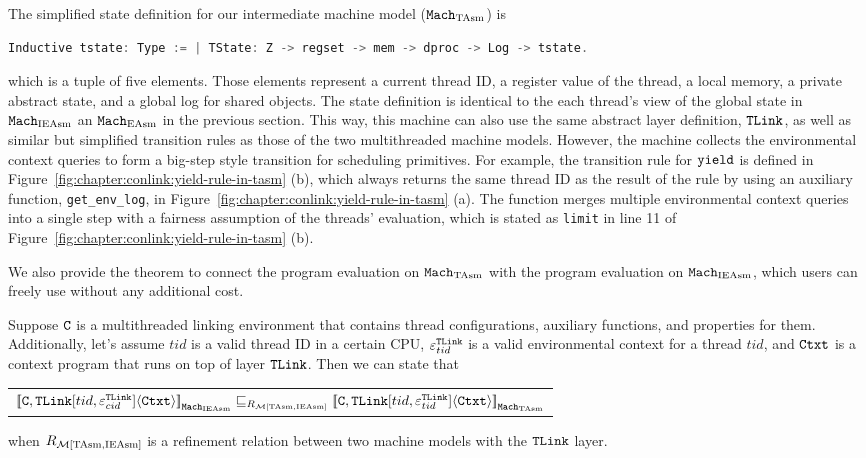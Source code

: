 The simplified state definition for our intermediate machine model (${\mathrm{\texttt{Mach}}}_{\mathrm{TAsm}}$) is
\begin{lstlisting}[language=C]
Inductive tstate: Type := | TState: Z -> regset -> mem -> dproc -> Log -> tstate.
\end{lstlisting}
which is a tuple of five elements. 
Those elements represent a current thread ID, 
a register value of the thread, a local memory, a private abstract state, and a global log for shared objects. 
The state definition is identical to the each thread's view of the global state in ${\mathrm{\texttt{Mach}}}_{\mathrm{IEAsm}}$ an ${\mathrm{\texttt{Mach}}}_{\mathrm{EAsm}}$ in the previous section. 
This way,
this machine can also use the same abstract layer definition, ${{\mathrm{\texttt{TLink}}}}$, 
as well as similar but simplified transition rules as those of the two multithreaded machine models.
However, the machine
 collects the environmental context queries to form a big-step style transition for scheduling primitives. 
 For example, 
 the transition rule for ${\mathrm{\texttt{yield}}}$ is defined in Figure~\ref{fig:chapter:conlink:yield-rule-in-tasm} (b),
 which always returns the same thread ID as the result of the rule 
 by using 
 an auxiliary function, \lstinline$get_env_log$, in  Figure~\ref{fig:chapter:conlink:yield-rule-in-tasm} (a).
 The function   merges multiple environmental context queries into a single step with a fairness assumption
 of the threads' evaluation, which is stated as \lstinline$limit$ in line 11 of  Figure~\ref{fig:chapter:conlink:yield-rule-in-tasm} (b).

We also provide 
the theorem to connect the program evaluation on ${\mathrm{\texttt{Mach}}}_{\mathrm{TAsm}}$
with the program evaluation on ${\mathrm{\texttt{Mach}}}_{\mathrm{IEAsm}}$,
which users can freely use without any additional cost.

\begin{lemma}
\label{lemma:chapter:conlink:ieasm-refines-tasm}
Suppose  ${{\mathrm{\texttt{C}}}}$ is a multithreaded linking environment that contains thread configurations, auxiliary functions, and properties for them. 
Additionally, let's assume  
 $tid$ is a valid thread ID in a certain CPU, 
 ${\varepsilon}^{{{\mathrm{\texttt{TLink}}}}}_{tid}$ is a valid
environmental context for a thread $tid$, 
and ${\mathrm{\texttt{Ctxt}}}$ is a
 context program that runs on top of layer ${{\mathrm{\texttt{TLink}}}}$.
 Then we can state that
 \begin{center}
\begin{tabular}{c}
${[\![{{{\mathrm{\texttt{C}}}}, {{\mathrm{\texttt{TLink}}}}[tid, {\varepsilon}^{{{\mathrm{\texttt{TLink}}}}}_{cid}]} \langle {{\mathrm{\texttt{Ctxt}}}} \rangle]\!]}_{{\mathrm{\texttt{Mach}}}_{\mathrm{IEAsm}}} \sqsubseteq_{R_{\mathcal{M}{[\mathrm{TAsm}, \mathrm{IEAsm}]}}} {[\![{{{\mathrm{\texttt{C}}}}, {{\mathrm{\texttt{TLink}}}}[tid, {\varepsilon}^{{{\mathrm{\texttt{TLink}}}}}_{tid}]} \langle {{\mathrm{\texttt{Ctxt}}}} \rangle]\!]}_{{\mathrm{\texttt{Mach}}}_{\mathrm{TAsm}}}$\\
\end{tabular}
\end{center}
when $R_{\mathcal{M}{[\mathrm{TAsm}, \mathrm{IEAsm}]}}$ is a refinement relation between two machine models with the  ${{\mathrm{\texttt{TLink}}}}$ layer.
\end{lemma}

